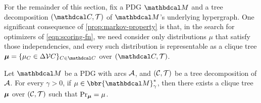 \documentclass{article}
\begin{document}
For the remainder of this section, fix a PDG $\dg M$ and a tree decomposition $(\mathdcal C, \mathcal T)$ of $\dg M$'s underlying hypergraph.
One significant consequence of \cref{prop:markov-property} is that, in the
search for optimizers of \eqref{eqn:scoring-fn}, we
need consider only distributions $\mu$ that satisfy those independencies,
and every such distribution is representable as a clique tree
$\bmu = \{\mu_C \in \Delta\V C \}_{C \in \mathdcal C}$
over $(\mathdcal C, \mathcal T)$.

\begin{coro}
    Let $\dg M$ be a PDG with arcs $\mathcal A$, and
    $(\cal C, T)$ be a tree decomposition of $\mathcal A$.
    For every $\gamma > 0$, if
    $\mu \in \bbr{\dg M}^*_\gamma$, then there exists a clique tree
    $\boldsymbol\mu$ over $(\cal C, T)$ such that $\Pr_{\boldsymbol\mu} = \mu$.
\end{coro}
\end{document}
